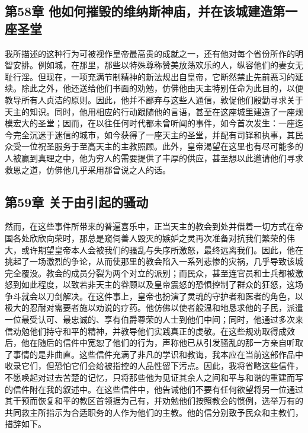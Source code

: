 \subsection{第58章 他如何摧毁的维纳斯神庙，并在该城建造第一座圣堂}

我所描述的这种行为可被视作皇帝最高贵的成就之一，还有他对每个省份所作的明智安排。例如城，在那里，那些以特殊尊称赞美放荡欢乐的人，纵容他们的妻女无耻行淫。但现在，一项充满节制精神的新法规出自皇帝，它断然禁止先前恶习的延续。除此之外，他还送给他们书面的劝勉，仿佛他由天主特别任命为此目的，以便教导所有人贞洁的原则。因此，他并不鄙弃与这些人通信，敦促他们殷勤寻求关于天主的知识。同时，他用相应的行动跟随他的言语，甚至在这座城里建造了一座规模宏大的圣堂；因而，在以往任何时代都未曾听闻的事件，如今首次发生：一座迄今完全沉迷于迷信的城市，如今获得了一座天主的圣堂，并配有司铎和执事，其民众受一位祝圣服务于至高天主的主教照顾。此外，皇帝渴望在这里也有尽可能多的人被赢到真理之中，他为穷人的需要提供了丰厚的供应，甚至想以此邀请他们寻求救恩之道，仿佛他几乎采用那曾说之人的话。\par


\subsection{第59章 关于由引起的骚动}

然而，在这些事件所带来的普遍喜乐中，正当天主的教会到处并借着一切方式在帝国各处欣欣向荣时，那总是窥伺善人毁灭的嫉妒之灵再次准备对抗我们繁荣的伟大，或许期望皇帝本人会被我们的骚乱与失序所激怒，最终远离我们。因此，他在挑起了一场激烈的争论，从而使那里的教会陷入一系列悲惨的灾祸，几乎导致该城完全覆没。教会的成员分裂为两个对立的派别；而民众，甚至连官员和士兵都被激怒到如此程度，以致若非天主的眷顾以及皇帝震怒的恐惧控制了群众的狂怒，这场争斗就会以刀剑解决。在这件事上，皇帝也扮演了灵魂的守护者和医者的角色，以极大的忍耐对需要者施以劝说的疗药。他仿佛以使者般温和地恳求他的子民，派遣一位最受认可、最忠诚的、享有伯爵尊荣的人士到他们中间；同时，他通过多次来信劝勉他们持守和平的精神，并教导他们实践真正的虔敬。在这些规劝取得成效后，他在随后的信件中宽恕了他们的行为，声称他已从引发骚乱的那一方亲自听取了事情的是非曲直。这些信件充满了非凡的学识和教诲，我本应在当前这部作品中收录它们，但恐怕它们会给被指控的人品性留下污点。因此，我将省略这些信件，不愿唤起对过去苦楚的记忆，只将那些他为见证其余人之间和平与和谐的重建而写的信件附在我的叙述中。在这些信件中，他告诫他们不要有任何欲望将另一位通过其干预而恢复和平的教区首领据为己有，并劝勉他们按照教会的惯例，选举万有的共同救主所指示为合适职务的人作为他们的主教。他的信分别致予民众和主教们，措辞如下。\par

